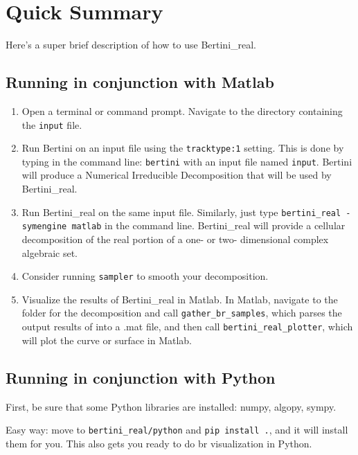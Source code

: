 
\section{Quick Summary}
\label{sec:started}

Here's a super brief description of how to use Bertini\_real.



\subsection{Running in conjunction with Matlab}

\begin{enumerate}
\item Open a terminal or command prompt. Navigate to the directory containing the {\tt input} file.
\item Run Bertini on an input file using the \texttt{tracktype:1} setting. This is done by typing in the command line: \texttt{bertini} with an input file named \texttt{input}. Bertini will produce a Numerical Irreducible Decomposition that will be used by Bertini\_real.
\item Run Bertini\_real on the same input file. Similarly, just type \texttt{bertini\_real -symengine matlab} in the command line. Bertini\_real will provide a cellular decomposition of the real portion of a one- or two- dimensional complex algebraic set.
\item Consider running {\tt sampler} to smooth your decomposition.
\item Visualize the results of Bertini\_real in Matlab. In Matlab, navigate to the folder for the decomposition and call \texttt{gather\_br\_samples}, which parses the output results of  into a .mat file, and then call \texttt{bertini\_real\_plotter}, which will plot the curve or surface in Matlab.  
\end{enumerate}

\subsection{Running in conjunction with Python}

First, be sure that some Python libraries are installed:  numpy, algopy, sympy.  

Easy way: move to \verb|bertini_real/python| and \verb|pip install .|, and it will install them for you.  This also gets you ready to do br visualization in Python.

